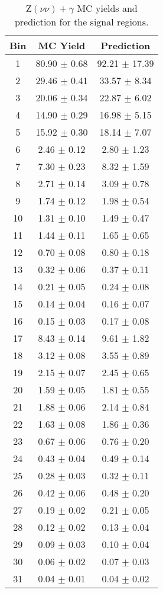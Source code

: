 \begin{table}[h!]
\centering
\caption{Z$(\nu\nu)+\gamma$ MC yields and prediction for the signal regions.}
\label{tab:znnPredictions}
\begin{tabular}{c|c|c}
Bin  & MC Yield & Prediction \\ \hline\hline
1 & 80.90  $\pm$  0.68  & 92.21 $\pm$ 17.39    \\\hline
2 & 29.46  $\pm$  0.41  & 33.57 $\pm$ 8.34    \\\hline
3 & 20.06  $\pm$  0.34  & 22.87 $\pm$ 6.02    \\\hline
4 & 14.90  $\pm$  0.29  & 16.98 $\pm$ 5.15    \\\hline
5 & 15.92  $\pm$  0.30  & 18.14 $\pm$ 7.07    \\\hline
6 & 2.46  $\pm$  0.12  & 2.80 $\pm$ 1.23    \\\hline
7 & 7.30  $\pm$  0.23  & 8.32 $\pm$ 1.59    \\\hline
8 & 2.71  $\pm$  0.14  & 3.09 $\pm$ 0.78    \\\hline
9 & 1.74  $\pm$  0.12  & 1.98 $\pm$ 0.54    \\\hline
10 & 1.31  $\pm$  0.10  & 1.49 $\pm$ 0.47    \\\hline
11 & 1.44  $\pm$  0.11  & 1.65 $\pm$ 0.65    \\\hline
12 & 0.70  $\pm$  0.08  & 0.80 $\pm$ 0.18    \\\hline
13 & 0.32  $\pm$  0.06  & 0.37 $\pm$ 0.11    \\\hline
14 & 0.21  $\pm$  0.05  & 0.24 $\pm$ 0.08    \\\hline
15 & 0.14  $\pm$  0.04  & 0.16 $\pm$ 0.07    \\\hline
16 & 0.15  $\pm$  0.03  & 0.17 $\pm$ 0.08    \\\hline
17 & 8.43  $\pm$  0.14  & 9.61 $\pm$ 1.82    \\\hline
18 & 3.12  $\pm$  0.08  & 3.55 $\pm$ 0.89    \\\hline
19 & 2.15  $\pm$  0.07  & 2.45 $\pm$ 0.65    \\\hline
20 & 1.59  $\pm$  0.05  & 1.81 $\pm$ 0.55    \\\hline
21 & 1.88  $\pm$  0.06  & 2.14 $\pm$ 0.84    \\\hline
22 & 1.63  $\pm$  0.08  & 1.86 $\pm$ 0.36    \\\hline
23 & 0.67  $\pm$  0.06  & 0.76 $\pm$ 0.20    \\\hline
24 & 0.43  $\pm$  0.04  & 0.49 $\pm$ 0.14    \\\hline
25 & 0.28  $\pm$  0.03  & 0.32 $\pm$ 0.11    \\\hline
26 & 0.42  $\pm$  0.06  & 0.48 $\pm$ 0.20    \\\hline
27 & 0.19  $\pm$  0.02  & 0.21 $\pm$ 0.05    \\\hline
28 & 0.12  $\pm$  0.02  & 0.13 $\pm$ 0.04    \\\hline
29 & 0.09  $\pm$  0.03  & 0.10 $\pm$ 0.04    \\\hline
30 & 0.06  $\pm$  0.02  & 0.07 $\pm$ 0.03    \\\hline
31 & 0.04  $\pm$  0.01  & 0.04 $\pm$ 0.02    \\\hline
\end{tabular}
\end{table}

